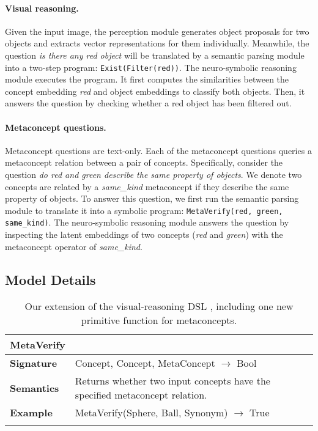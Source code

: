 \documentclass{article}
\newcommand{\myparagraph}[1]{\vspace{-10pt}\paragraph{#1}}
\begin{document}
\myparagraph{Visual reasoning.} Given the input image, the perception module generates object proposals for two objects and extracts vector representations for them individually. Meanwhile, the question {\it is there any red object} will be translated by a semantic parsing module into a two-step program: {\tt Exist(Filter(red))}. The neuro-symbolic reasoning module executes the program. It first computes the similarities between the concept embedding {\it red} and object embeddings to classify both objects. Then, it answers the question by checking whether a red object has been filtered out.

\myparagraph{Metaconcept questions.} Metaconcept questions are text-only. Each of the metaconcept questions queries a metaconcept relation between a pair of concepts. Specifically, consider the question {\it do red and green describe the same property of objects}. We denote two concepts are related by a {\it same\_kind} metaconcept if they describe the same property of objects. To answer this question, we first run the semantic parsing module to translate it into a symbolic program: {\tt MetaVerify(red, green, same\_kind)}. The neuro-symbolic reasoning module answers the question by inspecting the latent embeddings of two concepts ({\it red} and {\it green}) with the metaconcept operator of {\it same\_kind}.

\subsection{Model Details}

\begin{table}[t!]
    \centering
    \caption{Our extension of the visual-reasoning DSL \citep{Johnson2017CLEVR,Hudson2019GQA}, including one new primitive function for metaconcepts.}
    \vspace{5pt}
    \begin{tabular}{ll}
    \toprule
        {MetaVerify} & \\  \midrule
        {\bf Signature} & Concept, Concept, MetaConcept $\longrightarrow$ Bool  \\
        {\bf Semantics} & Returns whether two input concepts have the specified metaconcept relation. \\
        {\bf Example} & {MetaVerify}(Sphere, Ball, Synonym) $\longrightarrow$ {True}\\
\bottomrule
    \vspace{-2em}
    \end{tabular}
    \label{tab:dslext}
\end{table}
\end{document}
